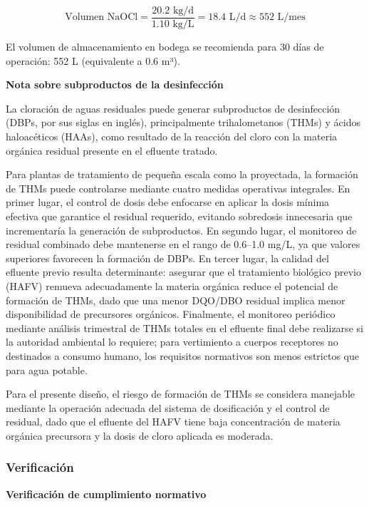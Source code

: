 \documentclass[12pt,a4paper]{article}
\begin{document}
\begin{equation}
\text{Volumen NaOCl} = \frac{20.2 \text{ kg/d}}{1.10 \text{ kg/L}} = 18.4 \text{ L/d} \approx 552 \text{ L/mes}
\end{equation}

El volumen de almacenamiento en bodega se recomienda para 30 días de operación: 552 L (equivalente a 0.6 m³).

\textbf{Nota sobre subproductos de la desinfección}

La cloración de aguas residuales puede generar subproductos de desinfección (DBPs, por sus siglas en inglés), principalmente trihalometanos (THMs) y ácidos haloacéticos (HAAs), como resultado de la reacción del cloro con la materia orgánica residual presente en el efluente tratado.

Para plantas de tratamiento de pequeña escala como la proyectada, la formación de THMs puede controlarse mediante cuatro medidas operativas integrales. En primer lugar, el control de dosis debe enfocarse en aplicar la dosis mínima efectiva que garantice el residual requerido, evitando sobredosis innecesaria que incrementaría la generación de subproductos. En segundo lugar, el monitoreo de residual combinado debe mantenerse en el rango de 0.6--1.0 mg/L, ya que valores superiores favorecen la formación de DBPs. En tercer lugar, la calidad del efluente previo resulta determinante: asegurar que el tratamiento biológico previo (HAFV) remueva adecuadamente la materia orgánica reduce el potencial de formación de THMs, dado que una menor DQO/DBO residual implica menor disponibilidad de precursores orgánicos. Finalmente, el monitoreo periódico mediante análisis trimestral de THMs totales en el efluente final debe realizarse si la autoridad ambiental lo requiere; para vertimiento a cuerpos receptores no destinados a consumo humano, los requisitos normativos son menos estrictos que para agua potable.

Para el presente diseño, el riesgo de formación de THMs se considera manejable mediante la operación adecuada del sistema de dosificación y el control de residual, dado que el efluente del HAFV tiene baja concentración de materia orgánica precursora y la dosis de cloro aplicada es moderada.

\subsubsection{Verificación}

\textbf{Verificación de cumplimiento normativo}
\end{document}

